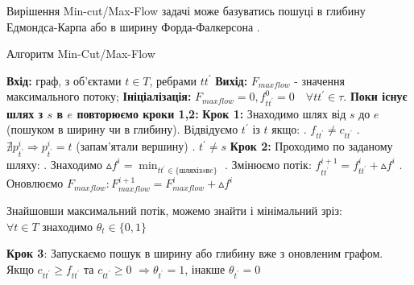 Вирішення Min-cut/Max-Flow задачі може базуватись пошуці в глибину \\ Едмондса-Карпа \cite{edmods_karp}
або в ширину Форда-Фалкерсона \cite{ford_fulkerson}.
\begin{algorithm}[H]
    \caption{Алгоритм Min-Cut/Max-Flow}
    \begin{algorithmic}
        \State \textbf{Вхід:} граф, з об'єктами $ t \in T $, ребрами $tt^{'} $
        \State \textbf{Вихід:} $ F_{maxflow} $ - значення максимального потоку;
        \State \textbf{Ініціалізація:} $ F_{maxflow} = 0, f_{tt^{'}}^{0} = 0 \quad \forall tt^{'}  \in \tau $.
        \State \textbf{Поки існує шлях з $s$ в $e$ повторюємо кроки 1,2:}
        \State \textbf{Крок 1:} Знаходимо шлях від $s$ до $e$ (пошуком в ширину чи в глибину).
        \State Відвідуємо $ t^{'}$ із $t $ якщо:
        \State {}. $ f_{tt^{'}} \neq c_{tt^{'}} $
        \State {}. $ \nexists p_{t^{'}}^{i} \Rightarrow p_{t^{'}}^{i} = t $ (запам'ятали вершину)
        \State {}. $ t^{'} \neq s $
        \State \textbf{Крок 2:} Проходимо по заданому шляху:
        \State {}. Знаходимо $ \vartriangle f^{i} = \min_{tt^{'} \in \{шлях із s в e \}} $
        \State {}. Змінюємо потік: $ f_{tt^{'}}^{i+1} = f_{tt^{'}}^{i} + \vartriangle f^{i} $
        \State {}. Оновлюємо $ F_{maxflow}: F_{maxflow}^{i+1} = F_{maxflow}^{i} + \vartriangle f^{i} $
    \end{algorithmic}

    Знайшовши максимальний потік, можемо знайти і мінімальний зріз: \\
    $\forall t \in T$ знаходимо $\theta_{t} \in \{0,1\}$
    \begin{algorithmic}
        \State \textbf{Крок 3}: Запускаємо пошук в ширину або глибину вже з оновленим графом.
        \State \qquad Якщо $c_{tt^{'}} \geqslant f_{tt^{'}}$ та $c_{tt^{'}} \geqslant 0$
        $\Rightarrow \theta_{t^{'}} = 1 $, інакше $\theta_{t^{'}} = 0 $
    \end{algorithmic}
\end{algorithm}

